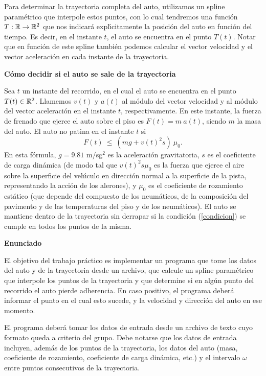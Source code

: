 Para determinar la trayectoria
completa del auto, utilizamos un spline param\'etrico que interpole estos
puntos, con lo cual tendremos una funci\'on $T:\mathbb R\to\mathbb R^2$ que nos
indicar\'a expl\'\i citamente la posici\'on del auto en funci\'on del tiempo.
Es decir, en el instante $t$, el auto se encuentra en el punto $T(t)$. Notar
que en funci\'on de este spline tambi\'en podemos calcular el vector velocidad y
el vector aceleraci\'on en cada instante de la trayectoria.

\vfil \eject

\textbf{C\'omo decidir si el auto se sale de la trayectoria}

Sea $t$ un instante del recorrido, en el cual el auto se encuentra en el
punto $T(t)\in\mathbb R^2$. Llamemos $v(t)$ y $a(t)$ al m\'odulo del
vector velocidad y al m\'odulo del vector aceleraci\'on en el instante $t$,
respectivamente. En este instante, la fuerza de frenado que ejerce el auto
sobre el piso es $F(t) = m\: a(t)$, siendo $m$ la masa del auto. El auto
no patina en el instante $t$ si
\begin{equation}
F(t) \ \le\ (mg + v(t)^2s) \: \mu_0. \label{condicion}
\end{equation}
En esta f\'ormula, $g=9.81$ m/sg${}^2$ es la aceleraci\'on gravitatoria,
$s$ es el coeficiente de carga din\'amica (de modo tal que $v(t)^2 s\mu_0$ es
la fuerza que ejerce el aire sobre la superficie del veh\'\i culo en
direcci\'on normal a la superficie de la pista, representando la acci\'on
de los alerones), y $\mu_0$ es el coeficiente de rozamiento est\'atico
(que depende del compuesto de los neum\'aticos, de la composici\'on del
pavimento y de las temperaturas del piso y de los neum\'aticos). El auto
se mantiene dentro de la trayectoria sin derrapar si la condici\'on
(\ref{condicion}) se cumple en todos los puntos de la misma.

\textbf{Enunciado}

El objetivo del trabajo pr\'actico es implementar un programa que tome los
datos del auto y de la trayectoria desde un archivo, que calcule un
spline param\'etrico que interpole los puntos de la trayectoria y que
determine si en alg\'un punto del recorrido el auto pierde adherencia. En
caso positivo, el programa deber\'a informar el punto en el cual esto
sucede, y la velocidad y direcci\'on del auto en ese momento.

El programa deber\'a tomar los datos de entrada desde un archivo de texto
cuyo formato queda a criterio del grupo. Debe notarse que los datos de
entrada incluyen, adem\'as de los puntos de la trayectoria, los datos del
auto (masa, coeficiente de rozamiento, coeficiente de carga din\'amica, etc.)
y el intervalo $\omega$ entre puntos consecutivos de la trayectoria.

